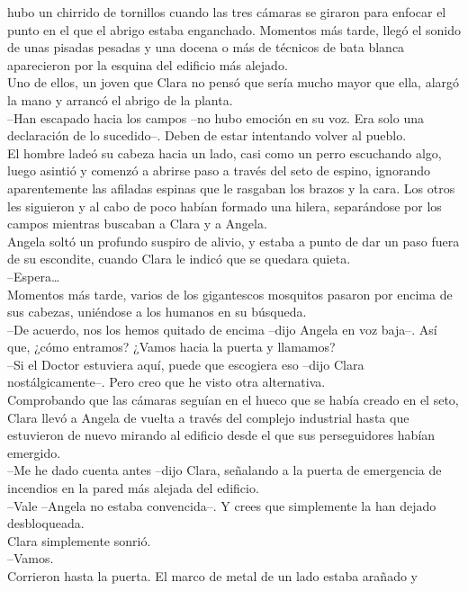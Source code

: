hubo un chirrido de tornillos cuando las tres cámaras se giraron para
enfocar el punto en el que el abrigo estaba enganchado. Momentos más
tarde, llegó el sonido de unas pisadas pesadas y una docena o más de
técnicos de bata blanca aparecieron por la esquina del edificio más
alejado.\\
Uno de ellos, un joven que Clara no pensó que sería mucho mayor que
ella, alargó la mano y arrancó el abrigo de la planta.\\
--Han escapado hacia los campos --no hubo emoción en su voz. Era solo
una declaración de lo sucedido--. Deben de estar intentando volver al
pueblo.\\
El hombre ladeó su cabeza hacia un lado, casi como un perro escuchando
algo, luego asintió y comenzó a abrirse paso a través del seto de
espino, ignorando aparentemente las afiladas espinas que le rasgaban los
brazos y la cara. Los otros les siguieron y al cabo de poco habían
formado una hilera, separándose por los campos mientras buscaban a Clara
y a Angela.\\
Angela soltó un profundo suspiro de alivio, y estaba a punto de dar un
paso fuera de su escondite, cuando Clara le indicó que se quedara
quieta.\\
--Espera\ldots{}\\
Momentos más tarde, varios de los gigantescos mosquitos pasaron por
encima de sus cabezas, uniéndose a los humanos en su búsqueda.\\
--De acuerdo, nos los hemos quitado de encima --dijo Angela en voz
baja--. Así que, ¿cómo entramos? ¿Vamos hacia la puerta y llamamos?\\
--Si el Doctor estuviera aquí, puede que escogiera eso --dijo Clara
nostálgicamente--. Pero creo que he visto otra alternativa.\\
Comprobando que las cámaras seguían en el hueco que se había creado en
el seto, Clara llevó a Angela de vuelta a través del complejo industrial
hasta que estuvieron de nuevo mirando al edificio desde el que sus
perseguidores habían emergido.\\
--Me he dado cuenta antes --dijo Clara, señalando a la puerta de
emergencia de incendios en la pared más alejada del edificio.\\
--Vale --Angela no estaba convencida--. Y crees que simplemente la han
dejado desbloqueada.\\
Clara simplemente sonrió.\\
--Vamos.\\
Corrieron hasta la puerta. El marco de metal de un lado estaba arañado y
